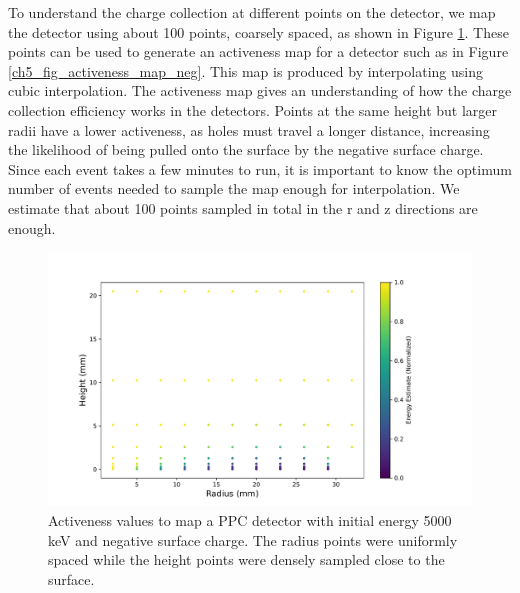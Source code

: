 To understand the charge collection at different points on the detector, we map the detector using about 100 points, coarsely spaced, as shown in Figure \ref{ch5_fig_activeness_points_neg}. These points can be used to generate an activeness map for a detector such as in Figure \ref{ch5_fig_activeness_map_neg}. This map is produced by interpolating using cubic interpolation. The activeness map gives an understanding of how the charge collection efficiency works in the detectors. Points at the same height but larger radii have a lower activeness, as holes must travel a longer distance, increasing the likelihood of being pulled onto the surface by the negative surface charge. Since each event takes a few minutes to run, it is important to know the optimum number of events needed to sample the map enough for interpolation. We estimate that about 100 points sampled in total in the r and z directions are enough.

\begin{figure}%
\includegraphics[trim={0cm 0.5cm 3.2cm 1.15cm},clip,width=0.9\linewidth]{ch5/figs/activenss_map_ponama_1_-0.3_5000.pdf}
\caption{Activeness values to map a PPC detector \ehd with initial energy 5000 keV and negative surface charge. The radius points were uniformly spaced while the height points were densely sampled close to the surface.}
\label{ch5_fig_activeness_points_neg}
\end{figure}

